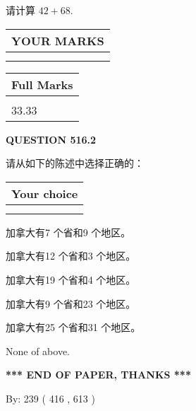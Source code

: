 \documentclass{ctexart}
\begin{document}
  
 
请计算 $ %
42 +  %
68 $.
 

 

 
  
\vspace{0.2in}
  
\noindent\begin{tabular}{|l|}
\hline
 YOUR MARKS  \\
\hline
 \\ 
 \\ 
\hline
\end{tabular}
\hspace{0.05in} \begin{tabular}{|l|}
\hline
 Full Marks  \\
\hline
 \\ 
33.33 \\
\hline
\end{tabular}
{\textbf{\Large{QUESTION
516.2 
}}}
  
  
请从如下的陈述中选择正确的：
  
  
\noindent\hspace{3.0in} \begin{tabular}{|l|}
\hline
Your choice \\
\hline
 \\ 
 \\ 
\hline
\end{tabular}
  
  
 
 
加拿大有7 个省和9 个地区。
 
 
加拿大有12 个省和3 个地区。
 
 
加拿大有19 个省和4 个地区。
 
 
加拿大有9 个省和23 个地区。
 
 
加拿大有25 个省和31 个地区。
 
 
 None of above.
 
 
   
   
 \vspace{0.2in}
 
   
   
   
   
\vspace{1.0in} 
{\textbf{\large{ *** END OF PAPER, THANKS *** }}} 
   
   
\hspace{1.0in} By: 
 239 ( 416 ,  613 )
   
\end{document}
